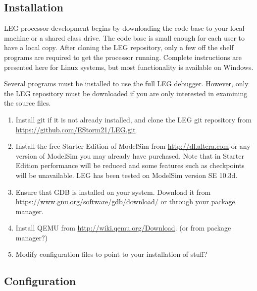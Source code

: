 \subsection{Installation}
LEG processor development begins by downloading the code base to your local machine or a shared class drive.
The code base is small enough for each user to have a local copy.
After cloning the LEG repository, only a few off the shelf programs are required to get the processor running.
Complete instructions are presented here for Linux systems, but most functionality is available on Windows.

Several programs must be installed to use the full LEG debugger. 
However, only the LEG repository must be downloaded if you are only interested in examining the source files.

\begin{enumerate}
\item Install git if it is not already installed, and clone the LEG git repository from \url{https://github.com/EStorm21/LEG.git}
\item Install the free Starter Edition of ModelSim from \url{http://dl.altera.com} or any version of ModelSim you may already have purchased. Note that in Starter Edition performance will be reduced and some features such as checkpoints will be unavailable. LEG has been tested on ModelSim version SE 10.3d. 
\item Ensure that GDB is installed on your system. Download it from \url{https://www.gnu.org/software/gdb/download/} or through your package manager.
\item Install QEMU from \url{http://wiki.qemu.org/Download}. (or from package manager?)
\item Modify configuration files to point to your installation of stuff?
\end{enumerate}

\subsection{Configuration}
